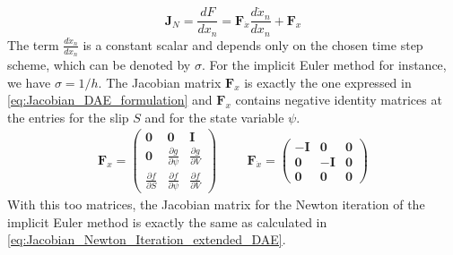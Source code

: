 \begin{equation}
	\mathbf{J}_N = \frac{dF}{dx_n} = \mathbf{F}_{\dot{x}}\frac{d\dot{x}_n}{dx_n} + \mathbf{F}_x	
\end{equation}
The term $\frac{d\dot{x}_n}{dx_n}$ is a constant scalar and depends only on the chosen time step scheme, which can be denoted by $\sigma$. For the implicit Euler method for instance, we have $\sigma = 1/h$. The Jacobian matrix $\mathbf{F}_x$ is exactly the one expressed in \autoref{eq:Jacobian_DAE_formulation} and $\mathbf{F}_x$ contains negative identity matrices at the entries for the slip $S$ and for the state variable $\psi$.
\begin{align}
	\mathbf{F}_x = \begin{pmatrix} 
		\mathbf{0}                     &  \mathbf{0}                       & 
		\mathbf{I}                    \\ 
		\mathbf{0}                     &  \frac{\partial g}{\partial \psi} & 
		\frac{\partial g}{\partial V} \\ 
		\frac{\partial f}{\partial S}  &  \frac{\partial f}{\partial \psi} &  
		\frac{\partial f}{\partial V} 
	\end{pmatrix} &&&
	\mathbf{F}_{\dot{x}} = \begin{pmatrix} 
		-\mathbf{I}  &  \mathbf{0}  & \mathbf{0} \\ 
  		 \mathbf{0}  & -\mathbf{I}  & \mathbf{0} \\ 
		 \mathbf{0}  &  \mathbf{0}  & \mathbf{0}
	\end{pmatrix}
\end{align}
With this too matrices, the Jacobian matrix for the Newton iteration of the implicit Euler method is exactly the same as calculated in \autoref{eq:Jacobian_Newton_Iteration_extended_DAE}.

